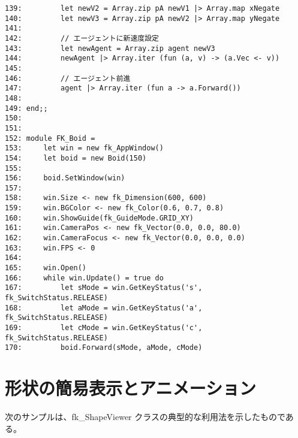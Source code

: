 \begin{breakbox}
\begin{small}
\begin{verbatim}
139:         let newV2 = Array.zip pA newV1 |> Array.map xNegate
140:         let newV3 = Array.zip pA newV2 |> Array.map yNegate
141: 
142:         // エージェントに新速度設定
143:         let newAgent = Array.zip agent newV3
144:         newAgent |> Array.iter (fun (a, v) -> (a.Vec <- v))
145: 
146:         // エージェント前進
147:         agent |> Array.iter (fun a -> a.Forward())
148: 
149: end;;
150: 
151: 
152: module FK_Boid =
153:     let win = new fk_AppWindow()
154:     let boid = new Boid(150)
155: 
156:     boid.SetWindow(win)
157: 
158:     win.Size <- new fk_Dimension(600, 600)
159:     win.BGColor <- new fk_Color(0.6, 0.7, 0.8)
160:     win.ShowGuide(fk_GuideMode.GRID_XY)
161:     win.CameraPos <- new fk_Vector(0.0, 0.0, 80.0)
162:     win.CameraFocus <- new fk_Vector(0.0, 0.0, 0.0)
163:     win.FPS <- 0
164: 
165:     win.Open()
166:     while win.Update() = true do
167:         let sMode = win.GetKeyStatus('s', fk_SwitchStatus.RELEASE)
168:         let aMode = win.GetKeyStatus('a', fk_SwitchStatus.RELEASE)
169:         let cMode = win.GetKeyStatus('c', fk_SwitchStatus.RELEASE)
170:         boid.Forward(sMode, aMode, cMode)
\end{verbatim}
\end{small}
\end{breakbox}

\section{形状の簡易表示とアニメーション} \label{sec:sampleviewer}

次のサンプルは、fk\_ShapeViewer クラスの典型的な利用法を示したものである。\\ ~

